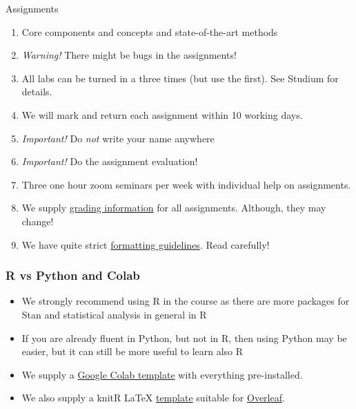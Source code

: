 \documentclass[10pt]{beamer}
\begin{document}
\begin{frame}{Assignments}

\begin{enumerate}
\item Core components and concepts and state-of-the-art methods\pause
\item \emph{Warning!} There might be bugs in the assignments!\pause
\item All labs can be turned in a three times (but use the first). See Studium for details.\pause
\item We will mark and return each assignment within 10 working days.\pause
\item \emph{Important!} Do \emph{not} write your name anywhere\pause
\item \emph{Important!} Do the assignment evaluation!\pause
\item Three one hour zoom seminars per week with individual help on assignments.\pause
\item We supply \href{https://github.com/MansMeg/BSDA/tree/main/grading}{grading information} for all assignments. Although, they may change! \pause
\item We have quite strict \href{https://github.com/MansMeg/BSDA/blob/main/templates/assignment_template.pdf}{formatting guidelines}. Read carefully!
\end{enumerate}
\end{frame}

\begin{frame}
  \frametitle{R vs Python and Colab}

  \begin{itemize}
    \item We strongly recommend using R in the course as there are more
    packages for Stan and statistical analysis in general in R\pause
    \item If you are already fluent in Python, but not in R, then using Python may be easier, but it can still be more useful to learn also R\pause
    \item We supply a \href{https://github.com/MansMeg/BSDA/blob/main/templates/bsda_colab_template.ipynb}{Google Colab template} with everything pre-installed.
    \pause
    \item We also supply a knitR \LaTeX{} \href{https://github.com/MansMeg/BSDA/blob/main/templates/assignment_template.Rtex}{template} suitable for \href{https://www.overleaf.com/}{Overleaf}.
  \end{itemize}

\end{frame}
\end{document}
